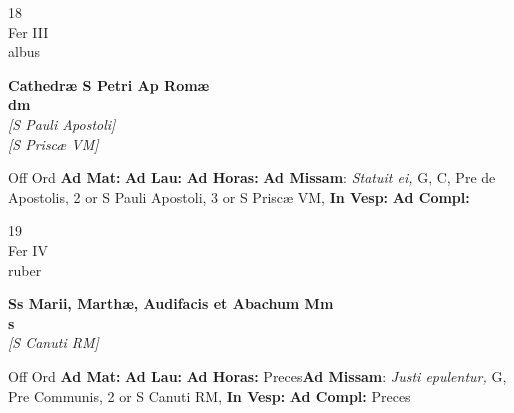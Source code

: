 \documentclass[10pt, openany]{book}
\begin{document}
        \begin{center}
            \begin{minipage}{3.5in}
                \vspace{2em}
                \begin{minipage}{0.5in}
                    {\Huge 18} \\
                    {\normalsize Fer III} \\
                    {\normalsize albus}
                \end{minipage}
                \begin{minipage}{3.0in}
                    \textbf{ \large Cathedræ S Petri Ap Romæ \\
                    \textnormal{\normalsize dm}} \\ \textit{[S Pauli Apostoli]} \\ \textit{[S Priscæ VM]} \\ 
                \end{minipage}
                \begin{justify}Off Ord
                    \textbf{Ad Mat: }
                    \textbf{Ad Lau: }
                    \textbf{Ad Horas: }\textbf{Ad Missam}: \textit{Statuit ei,} G, C, Pre de Apostolis, 2 or S Pauli Apostoli, 3 or S Priscæ VM,  
                    \textbf{In Vesp: }
                    \textbf{Ad Compl: }
                \end{justify}
            \end{minipage}
        \end{center}
    
        \begin{center}
            \begin{minipage}{3.5in}
                \vspace{2em}
                \begin{minipage}{0.5in}
                    {\Huge 19} \\
                    {\normalsize Fer IV} \\
                    {\normalsize ruber}
                \end{minipage}
                \begin{minipage}{3.0in}
                    \textbf{ \large Ss Marii, Marthæ, Audifacis et Abachum Mm \\
                    \textnormal{\normalsize s}} \\ \textit{[S Canuti RM]} \\ 
                \end{minipage}
                \begin{justify}Off Ord
                    \textbf{Ad Mat: }
                    \textbf{Ad Lau: }
                    \textbf{Ad Horas: }Preces\textbf{Ad Missam}: \textit{Justi epulentur,} G, Pre Communis, 2 or S Canuti RM,  
                    \textbf{In Vesp: }
                    \textbf{Ad Compl: }Preces
                \end{justify}
            \end{minipage}
        \end{center}
    
\end{document}
